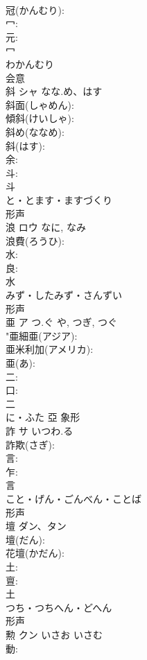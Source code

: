 \documentclass[8pt]{extreport}
\begin{document}
\begin{CJK}{UTF8}{min}
\\	冠(かんむり): 
\\	冖: 
\\	元: 
\\	冖	
\\	わかんむり	
\\	会意 
\\	斜	シャ	なな.め、はす		
\\	斜面(しゃめん): 
\\	傾斜(けいしゃ): 
\\	斜め(ななめ): 
\\	斜(はす): 
\\	余: 
\\	斗: 
\\	斗	
\\	と・とます・ますづくり	
\\	形声 
\\	浪	ロウ		なに, なみ	
\\	浪費(ろうひ): 
\\	水: 
\\	良: 
\\	水	
\\	みず・したみず・さんずい	
\\	形声 
\\	亜	ア	つ.ぐ	や, つぎ, つぐ	
\\	"亜細亜(アジア): 
\\	亜米利加(アメリカ): 
\\	亜(あ): 
\\	二: 
\\	口: 
\\	二	
\\	に・ふた	亞	象形 
\\	詐	サ	いつわ.る		
\\	詐欺(さぎ): 
\\	言: 
\\	乍: 
\\	言	
\\	こと・げん・ごんべん・ことば	
\\	形声 
\\	壇	ダン、タン			
\\	壇(だん): 
\\	花壇(かだん): 
\\	土: 
\\	亶: 
\\	土	
\\	つち・つちへん・どへん	
\\	形声 
\\	勲	クン	いさお	いさむ	
\\	動: 

\end{CJK}
\end{document}
